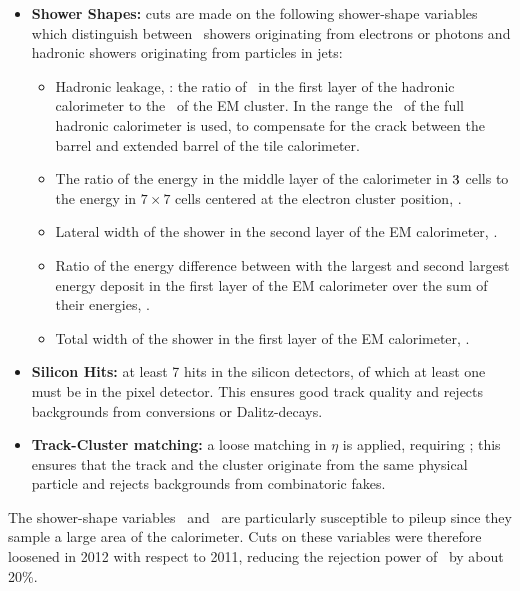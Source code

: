 \begin{itemize}

    \item {\bf Shower Shapes:} cuts are made on the following shower-shape
    variables which distinguish between \emag\ showers originating from
    electrons or photons and hadronic showers originating from particles in
    jets:

    \begin{itemize}
        \item Hadronic leakage, \Rhad: the ratio of \et\ in the first layer of
        the hadronic calorimeter to the \et\ of the EM cluster. In the range
         the \et\ of the full hadronic calorimeter is
        used, to compensate for the crack between the barrel and extended barrel
        of the tile calorimeter.
        \item The ratio of the energy in the middle layer of the
        calorimeter in $3 \time 7$ cells to the energy in $7
        \times 7$ cells centered at the electron cluster position, \Reta.
        \item Lateral width of the shower in the second layer of the EM
        calorimeter, \wetatwo.
        \item Ratio of the energy difference between with the largest and second
        largest energy deposit in the first layer of the EM calorimeter over the
        sum of their energies, \Eratio.
        \item Total width of the shower in the first layer of the EM
        calorimeter, \wstot.
    \end{itemize}

    \item {\bf Silicon Hits:} at least 7 hits in the silicon detectors, of which at
    least one must be in the pixel detector. This ensures good track quality and
    rejects backgrounds from conversions or Dalitz-decays.

    \item {\bf Track-Cluster matching:} a loose matching in $\eta$ is applied,
    requiring ; this ensures that the track and the
    cluster originate from the same physical particle and rejects backgrounds
    from combinatoric fakes. 
\end{itemize}

The shower-shape variables \Reta\ and \Rhad\ are particularly susceptible to
pileup since they sample a large area of the calorimeter. Cuts on these
variables were therefore
loosened in 2012 with respect to 2011, reducing the rejection power of \loosePP\
by about 20\%.

